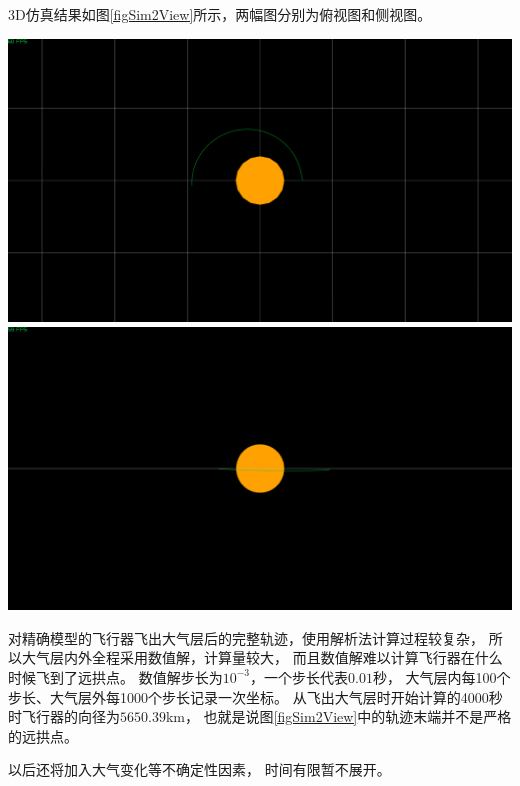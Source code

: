 3D仿真结果如图\ref{figSim2View}所示，两幅图分别为俯视图和侧视图。
\begin{center}
	\includegraphics[scale=0.2]{sim2Verticalview.png}  \\
	\includegraphics[scale=0.2]{sim2Sideview.png}  \\
	\label{figSim2View}
\end{center}
对精确模型的飞行器飞出大气层后的完整轨迹，使用解析法计算过程较复杂，
所以大气层内外全程采用数值解，计算量较大，
而且数值解难以计算飞行器在什么时候飞到了远拱点。
数值解步长为$10^{-3}$，一个步长代表$0.01$秒，
大气层内每100个步长、大气层外每1000个步长记录一次坐标。
从飞出大气层时开始计算的4000秒时飞行器的向径为$5650.39$km，
也就是说图\ref{figSim2View}中的轨迹末端并不是严格的远拱点。

以后还将加入大气变化等不确定性因素，
时间有限暂不展开。
